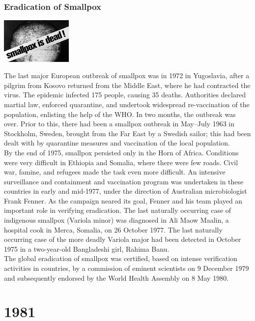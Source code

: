 \documentclass[11pt]{report}
\begin{document}
\subsection{Eradication of Smallpox}
\vspace{2mm}\begin{center}\includegraphics[width=3.5cm]{./img/smallpoxDead.jpeg}\end{center}
The last major European outbreak of smallpox was in 1972 in Yugoslavia, after a pilgrim from Kosovo returned from the Middle East, where he had contracted the virus. The epidemic infected 175 people, causing 35 deaths. Authorities declared martial law, enforced quarantine, and undertook widespread re-vaccination of the population, enlisting the help of the WHO. In two months, the outbreak was over. Prior to this, there had been a smallpox outbreak in May–July 1963 in Stockholm, Sweden, brought from the Far East by a Swedish sailor; this had been dealt with by quarantine measures and vaccination of the local population.\\ \indent By the end of 1975, smallpox persisted only in the Horn of Africa. Conditions were very difficult in Ethiopia and Somalia, where there were few roads. Civil war, famine, and refugees made the task even more difficult. An intensive surveillance and containment and vaccination program was undertaken in these countries in early and mid-1977, under the direction of Australian microbiologist Frank Fenner. As the campaign neared its goal, Fenner and his team played an important role in verifying eradication. The last naturally occurring case of indigenous smallpox (Variola minor) was diagnosed in Ali Maow Maalin, a hospital cook in Merca, Somalia, on 26 October 1977. The last naturally occurring case of the more deadly Variola major had been detected in October 1975 in a two-year-old Bangladeshi girl, Rahima Banu.\\
\indent The global eradication of smallpox was certified, based on intense verification activities in countries, by a commission of eminent scientists on 9 December 1979 and subsequently endorsed by the World Health Assembly on 8 May 1980.

\chapter{1981}
\end{document}
